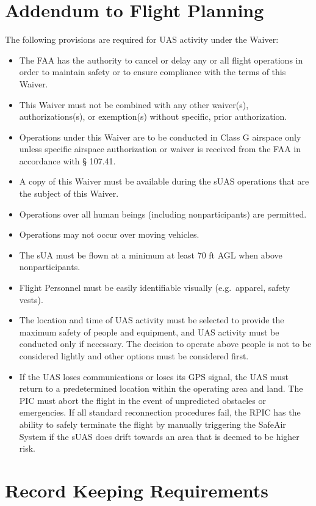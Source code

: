 \documentclass[
]{book}
\providecommand{\tightlist}{%
  \setlength{\itemsep}{0pt}\setlength{\parskip}{0pt}}
\begin{document}
\section{Addendum to Flight Planning}\label{s39p-fp}

The following provisions are required for UAS activity under the Waiver:

\begin{itemize}
\tightlist
\item
  The FAA has the authority to cancel or delay any or all flight operations in order to maintain safety or to ensure compliance with the terms of this Waiver.
\item
  This Waiver must not be combined with any other waiver(s), authorizations(s), or exemption(s) without specific, prior authorization.
\item
  Operations under this Waiver are to be conducted in Class G airspace only unless specific airspace authorization or waiver is received from the FAA in accordance with § 107.41.
\item
  A copy of this Waiver must be available during the sUAS operations that are the subject of this Waiver.
\item
  Operations over all human beings (including nonparticipants) are permitted.
\item
  Operations may not occur over moving vehicles.
\item
  The sUA must be flown at a minimum at least 70 ft AGL when above nonparticipants.
\item
  Flight Personnel must be easily identifiable visually (e.g.~apparel, safety vests).
\item
  The location and time of UAS activity must be selected to provide the maximum safety of people and equipment, and UAS activity must be conducted only if necessary. The decision to operate above people is not to be considered lightly and other options must be considered first.
\item
  If the UAS loses communications or loses its GPS signal, the UAS must return to a predetermined location within the operating area and land. The PIC must abort the flight in the event of unpredicted obstacles or emergencies. If all standard reconnection procedures fail, the RPIC has the ability to safely terminate the flight by manually triggering the SafeAir System if the sUAS does drift towards an area that is deemed to be higher risk.
\end{itemize}

\section{Record Keeping Requirements}\label{s39p-rk}
\end{document}
